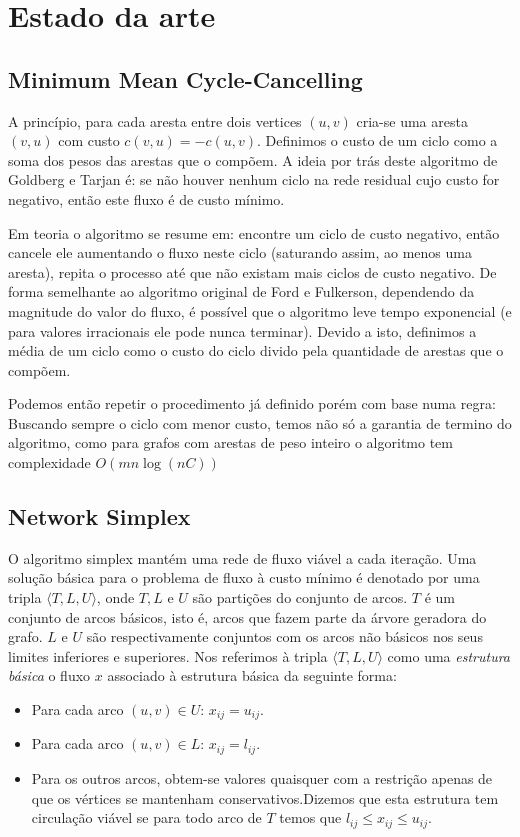 \documentclass[12pt, a4]{article}
\begin{document}
\section{Estado da arte}

\subsection{Minimum Mean Cycle-Cancelling}

A princípio, para cada aresta entre dois vertices $(u,v)$ cria-se uma aresta
$(v,u)$ com custo $c(v,u) = -c(u,v)$. Definimos o custo de um ciclo como a soma
dos pesos das arestas que o compõem. A ideia por trás deste algoritmo de
Goldberg e Tarjan é: se não houver nenhum ciclo na rede residual cujo custo for
negativo, então este fluxo é de custo mínimo.

Em teoria o algoritmo se resume em: encontre um ciclo de custo negativo, então
cancele ele aumentando o fluxo neste ciclo (saturando assim, ao menos uma
aresta), repita o processo até que não existam mais ciclos de custo negativo. De
forma semelhante ao algoritmo original de Ford e Fulkerson, dependendo da
magnitude do valor do fluxo, é possível que o algoritmo leve tempo exponencial
(e para valores irracionais ele pode nunca terminar). Devido a isto, definimos a
média de um ciclo como o custo do ciclo divido pela quantidade de arestas que o
compõem.

Podemos então repetir o procedimento já definido porém com base numa regra:
Buscando sempre o ciclo com menor custo, temos não só a garantia de termino do
algoritmo, como para grafos com arestas de peso inteiro o algoritmo tem
complexidade $O(mn \log(nC))$

\subsection{Network Simplex}
O algoritmo simplex mantém uma rede de fluxo viável a cada iteração. Uma solução
básica para o problema de fluxo à custo mínimo é denotado por uma tripla
$\langle T,L,U \rangle$, onde $T,L$ e $U$ são partições do conjunto de arcos.
$T$ é um conjunto de arcos básicos, isto é, arcos que fazem parte da árvore
geradora do grafo. $L$ e $U$ são respectivamente conjuntos com os arcos não
básicos nos seus limites inferiores e superiores. Nos referimos à tripla
$\langle T,L,U \rangle$ como uma \textit{estrutura básica} o fluxo $x$ associado
à estrutura básica da seguinte forma:

\begin{itemize}
\item Para cada arco $(u,v) \in U$: $x_{ij} = u_{ij}$.

\item Para cada arco $(u,v) \in L$: $x_{ij} = l_{ij}$.

\item Para os outros arcos, obtem-se valores quaisquer com a restrição apenas de
    que os vértices se mantenham conservativos.Dizemos que esta estrutura tem
    circulação viável se para todo arco de $T$ temos que
    $l_{ij} \leq x_{ij} \leq u_{ij}$.
\end{itemize}
\end{document}

